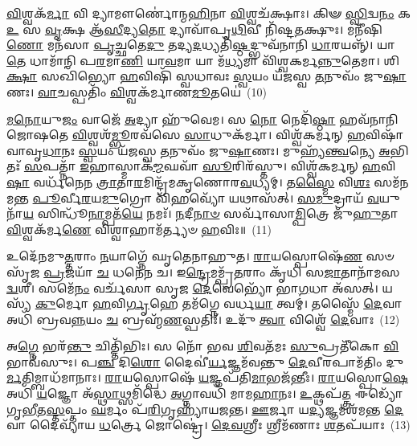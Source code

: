 \-\ul{𑌵𑌿}\-𑌶𑍍𑌵𑌕᳴\-\ul{𑌰𑍍𑌮𑌾} 𑌵𑌿 𑌦𑍍𑌯𑌾𑌮𑍗𑌰𑍍𑌣𑍋॑𑌨𑍍𑌮\-\ul{𑌹𑌿}\-𑌨𑌾 \ul{𑌵𑌿}\-𑌶𑍍𑌵𑌚᳴𑌕𑍍𑌷𑌾𑌃। 𑌕𑌿𑍟 \ul{𑌸𑍍𑌵𑌿}\-𑌦𑍍𑌵\-\ul{𑌨𑌂} 𑌕 \ul{𑌉} 𑌸 \ul{𑌵𑍃}\-𑌕𑍍𑌷 𑌆᳴\-\ul{𑌸𑍀}\-𑌦𑍍𑌯\-\ul{𑌤𑍋} 𑌦𑍍𑌯𑌾𑌵𑌾᳴𑌪𑍃\-\ul{𑌥𑌿}\-𑌵𑍀 𑌨𑌿᳴𑌷𑍍𑌟\-\ul{𑌤}\-𑌕𑍍𑌷𑍁𑌃। 𑌮𑌨𑍀᳴𑌷𑌿\-\ul{𑌣𑍋} 𑌮𑌨᳴𑌸𑌾 \ul{𑌪𑍃}\-𑌚𑍍𑌛𑌤𑍇\-\ul{𑌦𑍁} 𑌤𑌦𑍍𑌯\-\ul{𑌦}\-𑌧𑍍𑌯𑌤𑌿᳴\-\ul{𑌷𑍍𑌠}\-𑌦𑍍𑌭𑍁𑌵᳴𑌨𑌾𑌨𑌿 \ul{𑌧𑌾}\-𑌰𑌯𑌨𑍍𑌨𑍍᳴। 𑌯𑌾 \ul{𑌤𑍇} 𑌧𑌾𑌮𑌾᳴𑌨𑌿 𑌪\-\ul{𑌰}\-𑌮𑌾\-\ul{𑌣𑌿} 𑌯𑌾\-\ul{𑌵}\-𑌮𑌾 𑌯𑌾 𑌮᳴\-\ul{𑌧𑍍𑌯}\-𑌮𑌾 𑌵𑌿᳴𑌶𑍍𑌵𑌕𑌰𑍍𑌮\-\ul{𑌨𑍍𑌨𑍁}\-𑌤𑍇𑌮𑌾। 𑌶𑌿\-\ul{𑌕𑍍𑌷𑌾} 𑌸𑌖𑌿᳴𑌭𑍍𑌯𑍋 \ul{𑌹}\-𑌵𑌿𑌷𑌿᳴ 𑌸𑍍𑌵𑌧𑌾𑌵𑌃 \ul{𑌸𑍍𑌵}\-𑌯𑌂 𑌯᳴𑌜𑌸𑍍𑌵 \ul{𑌤}\-𑌨𑍁𑌵𑌂᳴ 𑌜𑍁\-\ul{𑌷𑌾}\-𑌣𑌃। \ul{𑌵𑌾}\-𑌚𑌸𑍍𑌪𑌤𑌿𑌂᳴ \ul{𑌵𑌿}\-𑌶𑍍𑌵𑌕᳴𑌰𑍍𑌮𑌾𑌣\-\ul{𑌮𑍂}\-𑌤𑌯𑍇॑~(10)

\-\ul{𑌮}\-\-\ul{𑌨𑍋}\-𑌯𑍁\-\ul{𑌜𑌂} 𑌵𑌾𑌜𑍇᳴ \ul{𑌅}\-𑌦𑍍𑌯𑌾 𑌹𑍁᳴𑌵𑍇𑌮। 𑌸 \ul{𑌨𑍋} 𑌨𑍇𑌦𑌿᳴\-\ul{𑌷𑍍𑌠𑌾} 𑌹𑌵᳴𑌨𑌾𑌨𑌿 𑌜𑍋𑌷𑌤𑍇 \ul{𑌵𑌿}\-𑌶𑍍𑌵𑌶᳴\-\ul{𑌮𑍍𑌭𑍂}\-𑌰𑌵᳴𑌸𑍇 \ul{𑌸𑌾}\-𑌧𑍁𑌕᳴𑌰𑍍𑌮𑌾। 𑌵𑌿𑌶𑍍𑌵᳴𑌕𑌰𑍍𑌮𑌨𑍍 \ul{𑌹}\-𑌵𑌿𑌷𑌾᳴ 𑌵𑌾𑌵𑍃\-\ul{𑌧𑌾}\-𑌨𑌃 \ul{𑌸𑍍𑌵}\-𑌯𑌂 𑌯᳴𑌜𑌸𑍍𑌵 \ul{𑌤}\-𑌨𑍁𑌵𑌂᳴ 𑌜𑍁\-\ul{𑌷𑌾}\-𑌣𑌃। 𑌮𑍁𑌹𑍍𑌯᳴\-\ul{𑌨𑍍𑌤𑍍𑌵}\-𑌨𑍍𑌯𑍇 \ul{𑌅}\-𑌭𑌿𑌤𑌃᳴ \ul{𑌸}\-𑌪𑌤𑍍𑌨𑌾᳴ \ul{𑌇}\-𑌹𑌾𑌸𑍍𑌮𑌾𑌕᳴\-\ul{𑌮𑍍𑌮}\-𑌘𑌵𑌾᳴ \ul{𑌸𑍂}\-𑌰𑌿𑌰᳴𑌸𑍍𑌤𑍁। 𑌵𑌿𑌶𑍍𑌵᳴𑌕𑌰𑍍𑌮𑌨𑍍 \ul{𑌹}\-𑌵𑌿\-\ul{𑌷𑌾} 𑌵𑌰𑍍𑌧᳴𑌨𑍇𑌨 \ul{𑌤𑍍𑌰𑌾}\-𑌤𑌾\-\ul{𑌰}\-𑌮𑌿𑌨𑍍𑌦𑍍𑌰᳴𑌮𑌕𑍃𑌣𑍋𑌰\-\ul{𑌵}\-𑌧𑍍𑌯𑌮𑍍। 𑌤\-\ul{𑌸𑍍𑌮𑍈} 𑌵𑌿\-\ul{𑌶𑌃} 𑌸𑌮᳴𑌨𑌮𑌨𑍍𑌤 \ul{𑌪𑍂}\-𑌰𑍍𑌵𑍀\-\ul{𑌰}\-𑌯\-\ul{𑌮𑍁}\-𑌗𑍍𑌰𑍋 𑌵𑌿᳴\-\ul{𑌹}\-𑌵𑍍𑌯𑍋᳴ 𑌯𑌥𑌾𑌸᳴𑌤𑍍। \ul{𑌸}\-\-\ul{𑌮𑍁}\-𑌦𑍍𑌰𑌾𑌯᳴ \ul{𑌵}\-𑌯𑍁𑌨𑌾᳴\-\ul{𑌯} 𑌸𑌿𑌨𑍍𑌧𑍂᳴\-\ul{𑌨𑌾}\-𑌮𑍍𑌪𑌤᳴\-\ul{𑌯𑍇} 𑌨𑌮𑌃᳴। \ul{𑌨}\-𑌦𑍀\-\ul{𑌨𑌾}\-\-\ul{𑍞} 𑌸𑌰𑍍𑌵𑌾᳴𑌸𑌾\-\ul{𑌮𑍍𑌪𑌿}\-𑌤𑍍𑌰𑍇 𑌜𑍁᳴\-\ul{𑌹𑍁}\-𑌤𑌾 \ul{𑌵𑌿}\-𑌶𑍍𑌵𑌕᳴𑌰𑍍𑌮\-\ul{𑌣𑍇} 𑌵𑌿𑌶𑍍𑌵𑌾𑌹𑌾𑌮᳴𑌰𑍍𑌤𑍍𑌯𑍞 \ul{𑌹}\-𑌵𑌿𑌃॥~(11)

{\anuvakamend[{\-\ul{𑌜}\-𑌜𑌾\-\ul{𑌨𑍈}\-𑌨𑍗𑌷᳴𑌧𑍀\-\ul{𑌨𑌾𑌂} 𑌭𑍂𑌮𑌿𑌂᳴ \ul{𑌜}\-𑌨𑌯᳴\-\ul{𑌨𑍍𑌨𑍂}\-𑌤\-\ul{𑌯𑍇} 𑌨\-\ul{𑌮𑍋} 𑌨𑌵᳴ 𑌚}]}%

𑌉𑌦𑍇᳴𑌨𑌮𑍁\-\ul{𑌤𑍍𑌤}\-𑌰𑌾𑌂 \ul{𑌨}\-𑌯𑌾𑌗𑍍𑌨𑍇᳴ 𑌘𑍃𑌤𑍇𑌨𑌾𑌹𑍁𑌤। \ul{𑌰𑌾}\-𑌯𑌸𑍍𑌪𑍋𑌷𑍇᳴\-\ul{𑌣} 𑌸𑍞 𑌸𑍃᳴𑌜 \ul{𑌪𑍍𑌰}\-𑌜𑌯𑌾᳴ \ul{𑌚} 𑌧𑌨𑍇᳴𑌨 𑌚। 𑌇\-\ul{𑌨𑍍𑌦𑍍𑌰𑍇}\-𑌮𑌮𑍍𑌪𑍍𑌰᳴\-\ul{𑌤}\-𑌰𑌾𑌂 𑌕𑍃᳴𑌧𑌿 𑌸\-\ul{𑌜𑌾}\-𑌤𑌾𑌨𑌾᳴𑌮𑌸\-\ul{𑌦𑍍𑌵}\-𑌶𑍀। 𑌸𑌮𑍇᳴\-\ul{𑌨𑌂} 𑌵𑌰𑍍𑌚᳴𑌸𑌾 𑌸𑍃𑌜 \ul{𑌦𑍇}\-𑌵𑍇𑌭𑍍𑌯𑍋᳴ 𑌭𑌾\-\ul{𑌗}\-𑌧𑌾 𑌅᳴𑌸𑌤𑍍। 𑌯𑌸𑍍𑌯᳴ \ul{𑌕𑍁}\-𑌰𑍍𑌮𑍋 \ul{𑌹}\-𑌵𑌿\-\ul{𑌰𑍍𑌗𑍃}\-𑌹𑍇 𑌤𑌮᳴𑌗𑍍𑌨𑍇 𑌵𑌰𑍍𑌧\-\ul{𑌯𑌾} 𑌤𑍍𑌵𑌮𑍍। 𑌤𑌸𑍍𑌮𑍈᳴ \ul{𑌦𑍇}\-𑌵𑌾 𑌅𑌧𑌿᳴ 𑌬𑍍𑌰𑌵\-\ul{𑌨𑍍𑌨}\-𑌯𑌂 \ul{𑌚} 𑌬𑍍𑌰𑌹𑍍𑌮᳴\-\ul{𑌣}\-𑌸𑍍𑌪𑌤𑌿𑌃᳴। 𑌉𑌦𑍁᳴ \ul{𑌤𑍍𑌵𑌾} 𑌵𑌿𑌶𑍍𑌵𑍇᳴ \ul{𑌦𑍇}\-𑌵𑌾𑌃~(12)

𑌅\-\ul{𑌗𑍍𑌨𑍇} 𑌭𑌰᳴\-\ul{𑌨𑍍𑌤𑍁} 𑌚𑌿𑌤𑍍𑌤𑌿᳴𑌭𑌿𑌃। 𑌸 𑌨𑍋᳴ 𑌭𑌵 \ul{𑌶𑌿}\-𑌵𑌤᳴𑌮𑌃 \ul{𑌸𑍁}\-𑌪𑍍𑌰𑌤𑍀᳴𑌕𑍋 \ul{𑌵𑌿}\-𑌭𑌾𑌵᳴𑌸𑍁𑌃। 𑌪\-\ul{𑌞𑍍𑌚} 𑌦𑌿\-\ul{𑌶𑍋} 𑌦𑍈𑌵𑍀॑\-\ul{𑌰𑍍𑌯}\-𑌜𑍍𑌞𑌮᳴𑌵𑌨𑍍𑌤𑍁 \ul{𑌦𑍇}\-𑌵𑍀𑌰𑌪𑌾𑌮᳴𑌤𑌿𑌂 𑌦𑍁\-\ul{𑌰𑍍𑌮}\-𑌤𑌿𑌮𑍍𑌬𑌾𑌧᳴𑌮𑌾𑌨𑌾𑌃। \ul{𑌰𑌾}\-𑌯𑌸𑍍𑌪𑍋𑌷𑍇᳴ \ul{𑌯}\-𑌜𑍍𑌞𑌪᳴𑌤𑌿\-\ul{𑌮𑌾}\-𑌭𑌜᳴𑌨𑍍𑌤𑍀𑌃। \ul{𑌰𑌾}\-𑌯𑌸𑍍𑌪𑍋\-\ul{𑌷𑍇} 𑌅𑌧𑌿᳴ \ul{𑌯}\-𑌜𑍍𑌞𑍋 𑌅᳴\-\ul{𑌸𑍍𑌥𑌾}\-𑌥𑍍𑌸𑌮𑌿᳴𑌦𑍍𑌧𑍇 \ul{𑌅}\-𑌗𑍍𑌨𑌾𑌵𑌧𑌿᳴ 𑌮𑌾𑌮\-\ul{𑌹𑌾}\-𑌨𑌃। \ul{𑌉}\-𑌕𑍍𑌥𑌪᳴\-\ul{𑌤𑍍𑌤𑍍𑌰} 𑌈𑌡𑍍𑌯𑍋᳴ 𑌗𑍃\-\ul{𑌭𑍀}\-𑌤\-\ul{𑌸𑍍𑌤}\-𑌪𑍍𑌤𑌂 \ul{𑌘}\-𑌰𑍍𑌮𑌂 𑌪᳴\-\ul{𑌰𑌿}\-𑌗𑍃𑌹𑍍𑌯𑌾᳴𑌯𑌜𑌨𑍍𑌤। \ul{𑌊}\-𑌰𑍍𑌜𑌾 𑌯\-\ul{𑌦𑍍𑌯}\-𑌜𑍍𑌞𑌮𑌶᳴𑌮𑌨𑍍𑌤 \ul{𑌦𑍇}\-𑌵𑌾 𑌦𑍈𑌵𑍍𑌯𑌾᳴𑌯 \ul{𑌧}\-𑌰𑍍𑌤𑍍𑌰𑍇 𑌜𑍋𑌷𑍍𑌟𑍍𑌰𑍇॑। \ul{𑌦𑍇}\-\-\ul{𑌵}\-𑌶𑍍𑌰𑍀𑌃 𑌶𑍍𑌰𑍀𑌮᳴𑌣𑌾𑌃 \ul{𑌶}\-𑌤𑌪᳴𑌯𑌾𑌃~(13)

